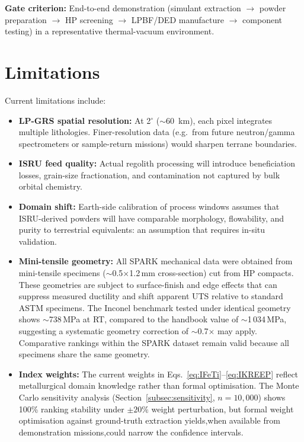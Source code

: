 \documentclass[11pt,a4paper]{article}
\begin{document}
\textbf{Gate criterion:} End-to-end demonstration (simulant extraction $\rightarrow$ powder preparation $\rightarrow$ HP screening $\rightarrow$ LPBF/DED manufacture $\rightarrow$ component testing) in a representative thermal-vacuum environment.

\section{Limitations}

Current limitations include:
\begin{itemize}[leftmargin=1.4em]
  \item \textbf{LP-GRS spatial resolution:} At 2$^\circ$ ($\sim$60~km), each pixel integrates multiple lithologies. Finer-resolution data (e.g.\ from future neutron/gamma spectrometers or sample-return missions) would sharpen terrane boundaries.
  \item \textbf{ISRU feed quality:} Actual regolith processing will introduce beneficiation losses, grain-size fractionation, and contamination not captured by bulk orbital chemistry.
  \item \textbf{Domain shift:} Earth-side calibration of process windows assumes that ISRU-derived powders will have comparable morphology, flowability, and purity to terrestrial equivalents: an assumption that requires in-situ validation.
  \item \textbf{Mini-tensile geometry:} All SPARK mechanical data were obtained from mini-tensile specimens ($\sim$0.5$\times$1.2\,mm cross-section) cut from HP compacts. These geometries are subject to surface-finish and edge effects that can suppress measured ductility and shift apparent UTS relative to standard ASTM specimens. The Inconel benchmark tested under identical geometry shows $\sim$738\,MPa at RT, compared to the handbook value of $\sim$1\,034\,MPa, suggesting a systematic geometry correction of $\sim$0.7$\times$ may apply. Comparative rankings within the SPARK dataset remain valid because all specimens share the same geometry.
  \item \textbf{Index weights:} The current weights in Eqs.~\ref{eq:IFeTi}--\ref{eq:IKREEP} reflect metallurgical domain knowledge rather than formal optimisation. The Monte Carlo sensitivity analysis (Section~\ref{subsec:sensitivity}, $n = 10{,}000$) shows 100\% ranking stability under $\pm 20\%$ weight perturbation, but formal weight optimisation against ground-truth extraction yields,when available from demonstration missions,could narrow the confidence intervals.

\end{itemize}
\end{document}
